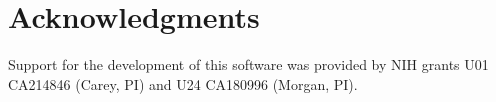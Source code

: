 \documentclass[applications]{gen-bioinformatics}
\begin{document}

\section*{Acknowledgments}
Support for the development of this software was provided by NIH grants
U01 CA214846 (Carey, PI) and U24 CA180996 (Morgan, PI).


\end{document}
